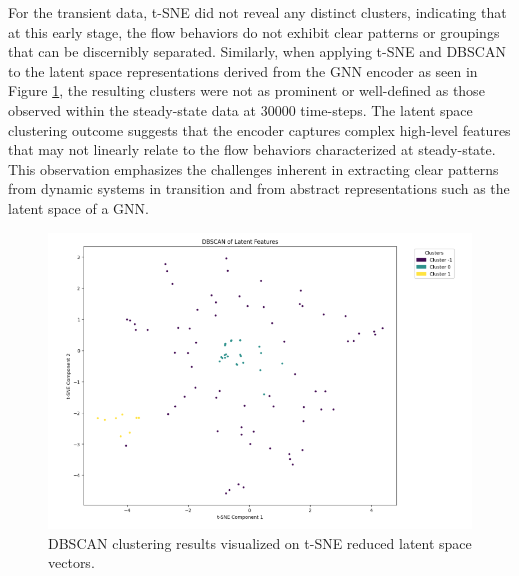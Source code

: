 For the transient data, t-SNE did not reveal any distinct clusters, indicating that at this early stage, the flow behaviors do not exhibit clear patterns or groupings that can be discernibly separated. Similarly, when applying t-SNE and DBSCAN to the latent space representations derived from the GNN encoder as seen in Figure \ref{fig:dbscan_results2}, the resulting clusters were not as prominent or well-defined as those observed within the steady-state data at 30000 time-steps. The latent space clustering outcome suggests that the encoder captures complex high-level features that may not linearly relate to the flow behaviors characterized at steady-state. This observation emphasizes the challenges inherent in extracting clear patterns from dynamic systems in transition and from abstract representations such as the latent space of a GNN.
\begin{figure}[ht]
    \centering
    \includegraphics[width=15cm]{images/Clustering/cluster2.png}
    \caption{DBSCAN clustering results visualized on t-SNE reduced latent space vectors.}
    \label{fig:dbscan_results2}
    \end{figure}